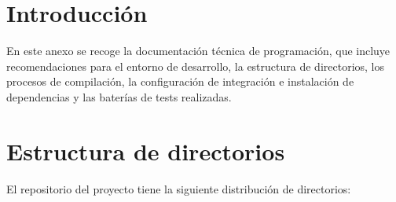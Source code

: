 
\section{Introducción}

En este anexo se recoge la documentación técnica de programación, que incluye recomendaciones para el entorno de desarrollo, la estructura de directorios, los procesos de compilación, la configuración de integración e instalación de dependencias y las baterías de tests realizadas. 

\section{Estructura de directorios}

El repositorio del proyecto tiene la siguiente distribución de directorios:


